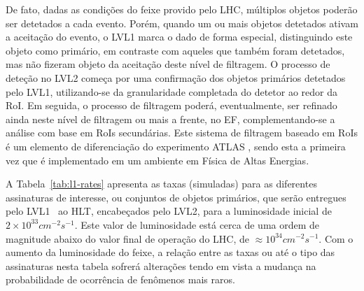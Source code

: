 De fato, dadas as condições do feixe provido pelo LHC, múltiplos objetos
poderão ser detetados a cada evento. Porém, quando um ou mais objetos
detetados ativam a aceitação do evento, o LVL1 marca o dado de forma especial,
distinguindo este objeto como primário, em contraste com aqueles que também
foram detetados, mas não fizeram objeto da aceitação deste nível de
filtragem. O processo de deteção no LVL2 começa por uma confirmação dos
objetos primários detetados pelo LVL1, utilizando-se da granularidade
completada do detetor ao redor da RoI. Em seguida, o processo de filtragem
poderá, eventualmente, ser refinado ainda neste nível de filtragem ou mais a
frente, no EF, complementando-se a análise com base em RoIs secundárias. Este
sistema de filtragem  baseado em RoIs é um elemento de
diferenciação do experimento ATLAS \cite{atlas-tp}, sendo esta a primeira vez
que é implementado em um ambiente em Física de Altas Energias.

A Tabela~\ref{tab:l1-rates} apresenta as taxas (simuladas) para as diferentes
assinaturas de interesse, ou conjuntos de objetos primários, que serão
entregues pelo LVL1~\cite{hlt-tdr} ao HLT, encabeçados pelo LVL2, para a
luminosidade inicial de $2\times10^{33}cm^{-2}s^{-1}$. Este valor de
luminosidade está cerca de uma ordem de magnitude abaixo do valor final de
operação do LHC, de $\approx 10^{34}cm^{-2}s^{-1}$. Com o aumento da
luminosidade do feixe, a relação entre as taxas ou até o tipo das assinaturas
nesta tabela sofrerá alterações tendo em vista a mudança na probabilidade de
ocorrência de fenômenos mais raros.

